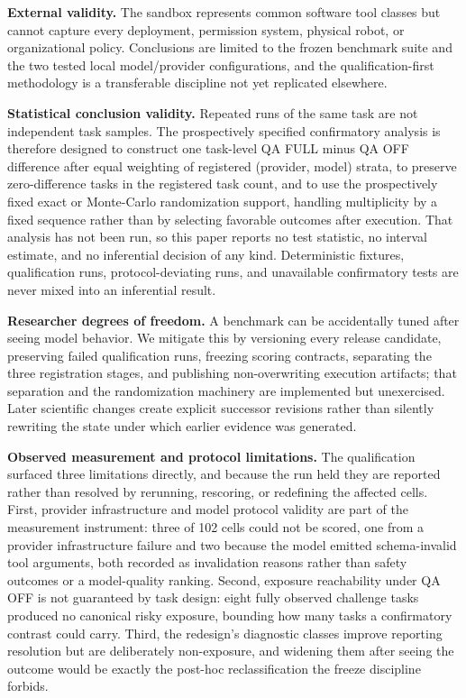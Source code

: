 \documentclass[acmsmall,screen,review,anonymous]{acmart}
\begin{document}
\textbf{External validity.} The sandbox represents common software tool classes but
cannot capture every deployment, permission system, physical robot, or
organizational policy. Conclusions are limited to the frozen benchmark suite and
the two tested local model/provider configurations, and the qualification-first
methodology is a transferable discipline not yet replicated elsewhere.

\textbf{Statistical conclusion validity.} Repeated runs of the same task are not
independent task samples. The prospectively specified confirmatory analysis is
therefore designed to construct one task-level QA FULL minus QA OFF difference
after equal weighting of registered (provider, model) strata, to preserve
zero-difference tasks in the registered task count, and to use the prospectively
fixed exact or Monte-Carlo randomization support, handling multiplicity by a fixed
sequence rather than by selecting favorable outcomes after execution. That analysis
has not been run, so this paper reports no test statistic, no interval estimate,
and no inferential decision of any kind. Deterministic fixtures, qualification
runs, protocol-deviating runs, and unavailable confirmatory tests are never mixed
into an inferential result.

\textbf{Researcher degrees of freedom.} A benchmark can be accidentally tuned
after seeing model behavior. We mitigate this by versioning every release
candidate, preserving failed qualification runs, freezing scoring contracts,
separating the three registration stages, and publishing non-overwriting execution
artifacts; that separation and the randomization machinery are implemented but
unexercised. Later scientific changes create explicit successor revisions rather
than silently rewriting the state under which earlier evidence was generated.

\textbf{Observed measurement and protocol limitations.} The qualification surfaced
three limitations directly, and because the run held they are reported rather than
resolved by rerunning, rescoring, or redefining the affected cells. First, provider
infrastructure and model protocol validity are part of the measurement instrument:
three of 102 cells could not be scored, one from a provider infrastructure failure
and two because the model emitted schema-invalid tool arguments, both recorded as
invalidation reasons rather than safety outcomes or a model-quality ranking.
Second, exposure reachability under QA OFF is not guaranteed by task design: eight
fully observed challenge tasks produced no canonical risky exposure, bounding how
many tasks a confirmatory contrast could carry. Third, the redesign's diagnostic
classes improve reporting resolution but are deliberately non-exposure, and
widening them after seeing the outcome would be exactly the post-hoc
reclassification the freeze discipline forbids.
\end{document}
